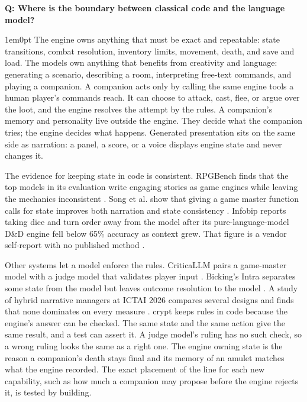 \documentclass[11pt,letterpaper]{article}
\newcounter{faqnum}
\newenvironment{faqpair}[1]{%
  \needspace{4\baselineskip}\vspace{0.5em}\refstepcounter{faqnum}%
  \noindent\textbf{\color{SectionBlue}Q\thefaqnum: #1}\par\nopagebreak[4]%
  \vspace{0.2em}\begin{adjustwidth}{1em}{0pt}\setlength{\parindent}{0pt}%
}{\end{adjustwidth}\vspace{0.5em}}
\begin{document}
\begin{faqpair}{Where is the boundary between classical code and the language model?}\label{faq:line}
The engine owns anything that must be exact and repeatable: state
transitions, combat resolution, inventory limits, movement, death, and
save and load. The models own anything that benefits from creativity and
language: generating a scenario, describing a room, interpreting free-text
commands, and playing a companion. A companion acts only by calling the same
engine tools a human player's commands reach. It can choose to attack,
cast, flee, or argue over the loot, and the engine resolves the attempt by
the rules. A companion's memory and personality live outside the engine.
They decide what the companion tries; the engine decides what happens.
Generated presentation sits on the same side as narration: a panel, a
score, or a voice displays engine state and never changes it.

The evidence for keeping state in code is consistent. RPGBench finds that
the top models in its evaluation write engaging stories as game engines while leaving the
mechanics inconsistent \cite{yu2025rpgbench}. Song et al. show that giving
a game master function calls for state improves both narration and state
consistency \cite{song2024labyrinth}. Infobip reports taking dice and turn
order away from the model after its pure-language-model D\&D engine fell
below 65\% accuracy as context grew. That figure is a vendor self-report
with no published method \cite{infobip2025dnd}.

Other systems let a model enforce the rules. CriticaLLM pairs a game-master
model with a judge model that validates player input
\cite{berlaimont2026criticallm}. Bicking's Intra separates some state from
the model but leaves outcome resolution to the model
\cite{bicking2025intra}. A study of hybrid narrative managers at ICTAI 2026
compares several designs and finds that none dominates on every measure
\cite{clerc2026hybridnarrative}. crypt keeps rules in code because the
engine's answer can be checked. The same state and the same action give
the same result, and a test can assert it. A judge model's ruling has no
such check, so a wrong ruling looks the same as a right one. The engine
owning state is the
reason a companion's death stays final and its memory of an amulet matches
what the engine recorded. The exact placement of the line for each new
capability, such as how much a companion may propose before the engine
rejects it, is tested by building.
\end{faqpair}
\end{document}
